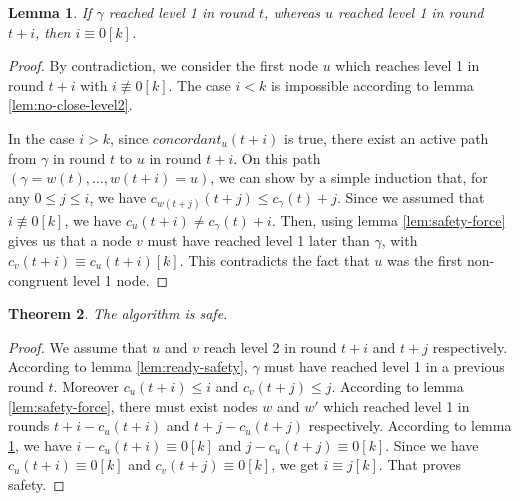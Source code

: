 \documentclass[11pt,letterpaper]{article}
\renewcommand{\leq}{\leqslant}
\newtheorem{thm}{Theorem}
\newtheorem{lem}[thm]{Lemma}
\newcommand{\cent}{\gamma}
\begin{document}
\begin{lem} \label{lem:later-level1}
	If $\cent$ reached level 1 in round $t$, whereas $u$ reached level 1 in round $t+i$, then $i \equiv 0 [k]$. 
\end{lem}
\begin{proof}
	By contradiction, we consider the first node $u$ which reaches level 1 in round $t+i$ with $i \not\equiv 0 [k]$.
	The case $i < k$ is impossible according to lemma \ref{lem:no-close-level2}.

	In the case $i > k$, since $concordant_u(t+i)$ is true, there exist an active path from $\cent$ in round $t$ to $u$ in round $t+i$.
	On this path $(\cent = w(t), \dots, w(t+i) = u)$, we can show by a simple induction that, for any $0 \leq j \leq i$, we have $c_{w(t+j)}(t+j) \leq c_\cent(t)+j$.
	Since we assumed that $i \not\equiv 0[k]$, we have $c_u(t+i) \neq c_\cent(t)+i$.
	Then, using lemma \ref{lem:safety-force} gives us that a node $v$ must have reached level 1 later than $\cent$, with $c_v(t+i) \equiv c_u(t+i) [k]$.
	This contradicts the fact that $u$ was the first non-congruent level 1 node.
\end{proof}

\begin{thm} \label{lem:safety} 
	The algorithm is safe.
\end{thm}
\begin{proof}
	We assume that $u$ and $v$ reach level 2 in round $t+i$ and $t+j$ respectively.
	According to lemma \ref{lem:ready-safety}, $\cent$ must have reached level 1 in a previous round $t$.
	Moreover $c_u(t+i) \leq i$ and $c_v(t+j) \leq j$.
	According to lemma \ref{lem:safety-force}, there must exist nodes $w$ and $w'$ which reached level 1 in rounds $t+i-c_u(t+i)$ and $t+j-c_u(t+j)$ respectively.
	According to lemma \ref{lem:later-level1}, we have $i-c_u(t+i) \equiv 0 [k]$ and $j-c_u(t+j) \equiv 0 [k]$. 
	Since we have $c_u(t+i) \equiv 0 [k]$ and $c_v(t+j) \equiv 0 [k]$, we get $i \equiv j [k]$. That proves safety.
\end{proof}
\end{document}
